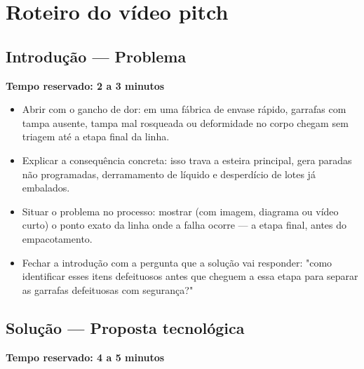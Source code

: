 \documentclass[12pt,a4paper]{report}
\begin{document}
\chapter*{Roteiro do vídeo pitch}

\section{Introdução — Problema}
\textbf{Tempo reservado: 2 a 3 minutos}

\begin{itemize}
    \item Abrir com o gancho de dor: em uma fábrica de envase rápido, garrafas com tampa ausente, tampa mal rosqueada ou deformidade no corpo chegam sem triagem até a etapa final da linha.
    \item Explicar a consequência concreta: isso trava a esteira principal, gera paradas não programadas, derramamento de líquido e desperdício de lotes já embalados.
    \item Situar o problema no processo: mostrar (com imagem, diagrama ou vídeo curto) o ponto exato da linha onde a falha ocorre — a etapa final, antes do empacotamento.
    \item Fechar a introdução com a pergunta que a solução vai responder: "como identificar esses itens defeituosos antes que cheguem a essa etapa para separar as garrafas defeituosas com segurança?"
\end{itemize}

\section{Solução — Proposta tecnológica}
\textbf{Tempo reservado: 4 a 5 minutos}
\end{document}
